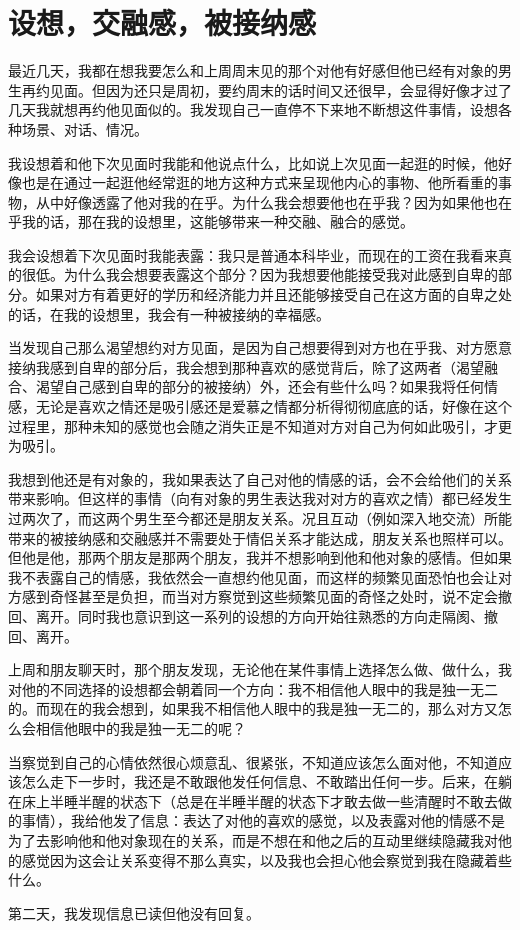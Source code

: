\chapter{设想，交融感，被接纳感}




最近几天，我都在想我要怎么和上周周末见的那个对他有好感但他已经有对象的男生再约见面。但因为还只是周初，要约周末的话时间又还很早，会显得好像才过了几天我就想再约他见面似的。我发现自己一直停不下来地不断想这件事情，设想各种场景、对话、情况。

我设想着和他下次见面时我能和他说点什么，比如说上次见面一起逛的时候，他好像也是在通过一起逛他经常逛的地方这种方式来呈现他内心的事物、他所看重的事物，从中好像透露了他对我的在乎。为什么我会想要他也在乎我？因为如果他也在乎我的话，那在我的设想里，这能够带来一种交融、融合的感觉。

我会设想着下次见面时我能表露：我只是普通本科毕业，而现在的工资在我看来真的很低。为什么我会想要表露这个部分？因为我想要他能接受我对此感到自卑的部分。如果对方有着更好的学历和经济能力并且还能够接受自己在这方面的自卑之处的话，在我的设想里，我会有一种被接纳的幸福感。

当发现自己那么渴望想约对方见面，是因为自己想要得到对方也在乎我、对方愿意接纳我感到自卑的部分后，我会想到那种喜欢的感觉背后，除了这两者（渴望融合、渴望自己感到自卑的部分的被接纳）外，还会有些什么吗？如果我将任何情感，无论是喜欢之情还是吸引感还是爱慕之情都分析得彻彻底底的话，好像在这个过程里，那种未知的感觉也会随之消失\pozhehao{}正是不知道对方对自己为何如此吸引，才更为吸引。

我想到他还是有对象的，我如果表达了自己对他的情感的话，会不会给他们的关系带来影响。但这样的事情（向有对象的男生表达我对对方的喜欢之情）都已经发生过两次了，而这两个男生至今都还是朋友关系。况且互动（例如深入地交流）所能带来的被接纳感和交融感并不需要处于情侣关系才能达成，朋友关系也照样可以。但他是他，那两个朋友是那两个朋友，我并不想影响到他和他对象的感情。但如果我不表露自己的情感，我依然会一直想约他见面，而这样的频繁见面恐怕也会让对方感到奇怪甚至是负担，而当对方察觉到这些频繁见面的奇怪之处时，说不定会撤回、离开。同时我也意识到这一系列的设想的方向开始往熟悉的方向走\pozhehao{}隔阂、撤回、离开。

上周和朋友聊天时，那个朋友发现，无论他在某件事情上选择怎么做、做什么，我对他的不同选择的设想都会朝着同一个方向：我不相信他人眼中的我是独一无二的。而现在的我会想到，如果我不相信他人眼中的我是独一无二的，那么对方又怎么会相信他眼中的我是独一无二的呢？

当察觉到自己的心情依然很心烦意乱、很紧张，不知道应该怎么面对他，不知道应该怎么走下一步时，我还是不敢跟他发任何信息、不敢踏出任何一步。后来，在躺在床上半睡半醒的状态下（总是在半睡半醒的状态下才敢去做一些清醒时不敢去做的事情），我给他发了信息：表达了对他的喜欢的感觉，以及表露对他的情感不是为了去影响他和他对象现在的关系，而是不想在和他之后的互动里继续隐藏我对他的感觉\pozhehao{}因为这会让关系变得不那么真实，以及我也会担心他会察觉到我在隐藏着些什么。

第二天，我发现信息已读但他没有回复。


